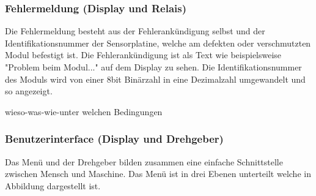 \subsubsection{Fehlermeldung (Display und Relais)}
Die Fehlermeldung besteht aus der Fehlerankündigung selbst und der Identifikationsnummer der Sensorplatine, welche am defekten oder verschmutzten Modul befestigt ist. Die Fehlerankündigung ist als Text wie beispielsweise "Problem beim Modul..." auf dem Display zu sehen. Die Identifikationsnummer des Moduls wird von einer 8bit Binärzahl in eine Dezimalzahl umgewandelt und so angezeigt.

wieso-was-wie-unter welchen Bedingungen
\subsubsection{Benutzerinterface (Display und Drehgeber)}

Das Menü und der Drehgeber bilden zusammen eine einfache Schnittstelle zwischen Mensch und Maschine. Das Menü ist in drei Ebenen unterteilt welche in Abbildung  dargestellt ist.


